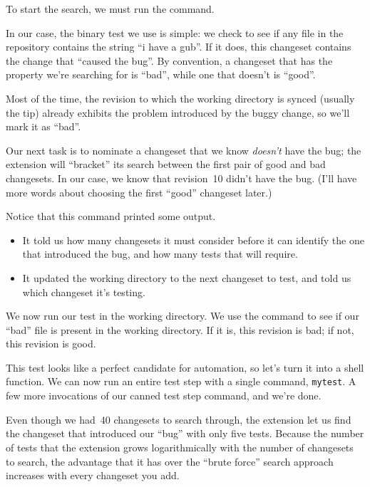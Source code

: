 To start the search, we must run the  command.

In our case, the binary test we use is simple: we check to see if any
file in the repository contains the string ``i have a gub''.  If it
does, this changeset contains the change that ``caused the bug''.  By
convention, a changeset that has the property we're searching for is
``bad'', while one that doesn't is ``good''.

Most of the time, the revision to which the working directory is
synced (usually the tip) already exhibits the problem introduced by
the buggy change, so we'll mark it as ``bad''.

Our next task is to nominate a changeset that we know \emph{doesn't}
have the bug; the  extension will ``bracket'' its search
between the first pair of good and bad changesets.  In our case, we
know that revision~10 didn't have the bug.  (I'll have more words
about choosing the first ``good'' changeset later.)

Notice that this command printed some output.
\begin{itemize}
\item It told us how many changesets it must consider before it can
  identify the one that introduced the bug, and how many tests that
  will require.
\item It updated the working directory to the next changeset to test,
  and told us which changeset it's testing.
\end{itemize}

We now run our test in the working directory.  We use the
 command to see if our ``bad'' file is present in the
working directory.  If it is, this revision is bad; if not, this
revision is good.

This test looks like a perfect candidate for automation, so let's turn
it into a shell function.
We can now run an entire test step with a single command,
\texttt{mytest}.
A few more invocations of our canned test step command, and we're
done.

Even though we had~40 changesets to search through, the 
extension let us find the changeset that introduced our ``bug'' with
only five tests.  Because the number of tests that the 
extension grows logarithmically with the number of changesets to
search, the advantage that it has over the ``brute force'' search
approach increases with every changeset you add.

